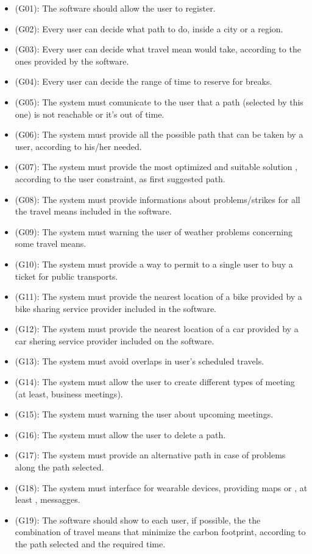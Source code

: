 \documentclass[a4paper,leqno]{book}
\begin{document}
\begin{itemize}
\item (G01): The software should allow the user to register.
\item (G02): Every user can decide what path to do, inside a city or a region.
\item (G03): Every user can decide what travel  mean  would take, according to the ones provided by the software.
\item (G04): Every user can decide the range of time to reserve for breaks. 
\item (G05): The system must comunicate to the user that a path (selected by this one) is not reachable or it's out of time.
\item (G06): The system must provide all the possible path that can be taken by a user, according to his/her needed.
\item (G07): The system must provide the most optimized and suitable solution , according to the user constraint, as first suggested path.
\item (G08): The system must provide informations about problems/strikes for all the travel means  included in the software.
\item (G09): The system must warning the user of weather problems concerning some travel means.
\item (G10): The system must provide a way to permit to a single user to buy a ticket for public transports.
\item (G11): The system must provide the nearest location of a bike provided by a bike sharing service provider included in the software.
\item (G12): The system must provide the nearest location of a car provided by a car shering service provider included on the software.
\item (G13): The system must avoid overlaps in user's scheduled travels.
\item (G14): The system must allow the user to create different types of meeting (at least, business meetings).
\item (G15): The system must warning the user about upcoming meetings.
\item (G16): The system must allow the user to delete a path.
\item (G17): The system must provide an alternative path in case of problems along the path selected.
\item (G18): The system must interface for wearable devices, providing maps or , at least , messagges.
\item (G19): The software should show to each user, if possible, the the combination of travel means that minimize the carbon footprint, according to the path selected and the required time.

\end{itemize}
\end{document}

